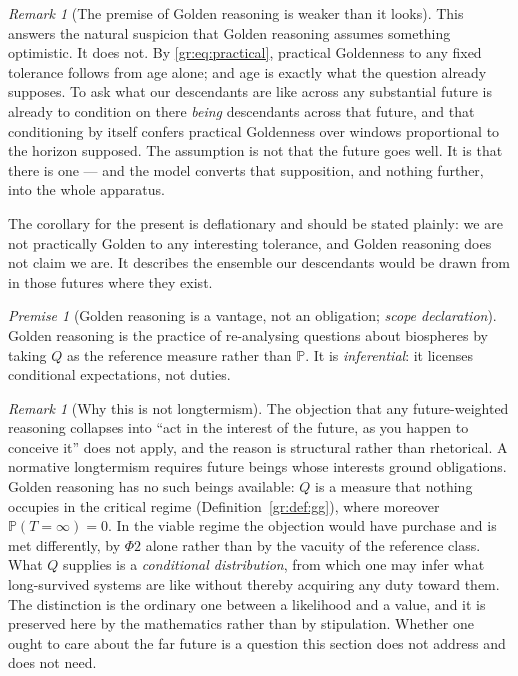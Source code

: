 \documentclass[11pt]{article}
\numberwithin{equation}{section}
\theoremstyle{plain}
\theoremstyle{definition}
\theoremstyle{remark}
\newtheorem{remark}[theorem]{Remark}
\newcommand{\PP}{\mathbb{P}}
\newtheorem{premise}{Premise}
\begin{document}
\begin{remark}[The premise of Golden reasoning is weaker than it looks]
\label{gr:rem:weakpremise}
This answers the natural suspicion that Golden reasoning assumes
something optimistic. It does not. By \eqref{gr:eq:practical}, practical
Goldenness to any fixed tolerance follows from age alone; and age is
exactly what the question already supposes. To ask what our descendants
are like across any substantial future is already to condition on there
\emph{being} descendants across that future, and that conditioning by
itself confers practical Goldenness over windows proportional to the
horizon supposed. The assumption is not that the future goes well. It is
that there is one --- and the model converts that supposition, and
nothing further, into the whole apparatus.

The corollary for the present is deflationary and should be stated
plainly: we are not practically Golden to any interesting tolerance, and
Golden reasoning does not claim we are. It describes the ensemble our
descendants would be drawn from in those futures where they exist.
\end{remark}

\begin{premise}[Golden reasoning is a vantage, not an obligation;
\emph{scope declaration}]\label{gr:phi2}
Golden reasoning is the practice of re-analysing questions about
biospheres by taking $Q$ as the reference measure rather than $\PP$. It
is \emph{inferential}: it licenses conditional expectations, not duties.
\end{premise}

\begin{remark}[Why this is not longtermism]\label{gr:rem:notlongtermism}
The objection that any future-weighted reasoning collapses into ``act in
the interest of the future, as you happen to conceive it'' does not
apply, and the reason is structural rather than rhetorical. A normative
longtermism requires future beings whose interests ground obligations.
Golden reasoning has no such beings available: $Q$ is a measure that
nothing occupies in the critical regime
(Definition~\ref{gr:def:gg}), where moreover $\PP(T=\infty)=0$. In the
viable regime the objection would have purchase and is met differently,
by $\Phi2$ alone rather than by the vacuity of the reference class. What $Q$ supplies is a
\emph{conditional distribution}, from which one may infer what
long-survived systems are like without thereby acquiring any duty toward
them. The distinction is the ordinary one between a likelihood and a
value, and it is preserved here by the mathematics rather than by
stipulation. Whether one ought to care about the far future is a
question this section does not address and does not need.
\end{remark}
\end{document}
